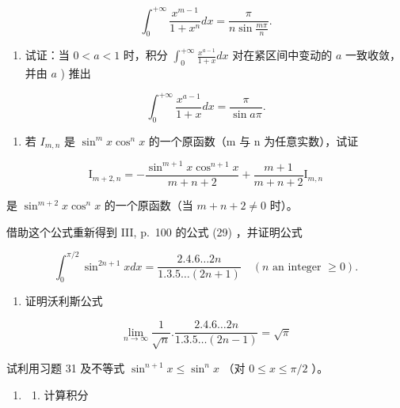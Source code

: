 \[
\int_ {0} ^ {+ \infty} \frac {x ^ {m - 1}}{1 + x ^ {n}} d x = \frac {\pi}{n \sin \frac {m \pi}{n}}.
\]

\begin{enumerate}
\def\labelenumi{\alph{enumi})}
\setcounter{enumi}{1}
\tightlist
\item
  试证：当 \(0 < a < 1\) 时，积分 \(\int_0^{+\infty} \frac{x^{a-1}}{1 + x} dx\) 对在紧区间中变动的 \(a\) 一致收敛，并由 \(a\) ) 推出
\end{enumerate}

\[
\int_ {0} ^ {+ \infty} \frac {x ^ {a - 1}}{1 + x} d x = \frac {\pi}{\sin a \pi}.
\]

\begin{enumerate}
\def\labelenumi{\arabic{enumi})}
\setcounter{enumi}{30}
\tightlist
\item
  若 \(I_{m,n}\) 是 \(\sin^{m}x\cos^{n}x\) 的一个原函数（m 与 n 为任意实数），试证
\end{enumerate}

\[
\mathrm{I} _ {m + 2, n} = - \frac {\sin^ {m + 1} x \cos^ {n + 1} x}{m + n + 2} + \frac {m + 1}{m + n + 2} \mathrm{I} _ {m, n}
\]

是 \(\sin^{m+2}x\cos^{n}x\) 的一个原函数（当 \(m+n+2\neq0\) 时）。

借助这个公式重新得到 III, p.~100 的公式 (29) ，并证明公式

\[
\int_ {0} ^ {\pi / 2} \sin^ {2 n + 1} x d x = \frac {2 . 4 . 6 \dots 2 n}{1 . 3 . 5 \dots (2 n + 1)} \quad (n \text {   an   integer   } \geqslant 0).
\]

\begin{enumerate}
\def\labelenumi{\arabic{enumi})}
\setcounter{enumi}{31}
\tightlist
\item
  证明沃利斯公式
\end{enumerate}

\[
\lim _ {n \rightarrow \infty} \frac {1}{\sqrt {n}}. \frac {2 . 4 . 6 \dots 2 n}{1 . 3 . 5 \dots (2 n - 1)} = \sqrt {\pi}
\]

试利用习题 31 及不等式 \(\sin^{n+1}x \leqslant \sin^{n}x\) （对 \(0 \leqslant x \leqslant \pi/2\) ）。

\begin{enumerate}
\def\labelenumi{\arabic{enumi})}
\setcounter{enumi}{32}
\tightlist
\item
  \begin{enumerate}
  \def\labelenumii{\alph{enumii})}
  \tightlist
  \item
    计算积分
  \end{enumerate}
\end{enumerate}

